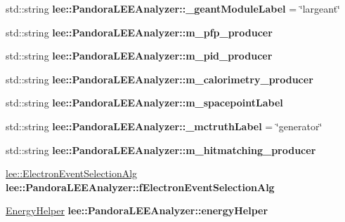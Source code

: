 \begin{DoxyCompactItemize}
\item 
\hypertarget{group__lee_gaf68d4bc3b81df418e7925567e36e5996}{std\-::string {\bfseries lee\-::\-Pandora\-L\-E\-E\-Analyzer\-::\-\_\-geant\-Module\-Label} = \char`\"{}largeant\char`\"{}}\label{group__lee_gaf68d4bc3b81df418e7925567e36e5996}

\item 
\hypertarget{group__lee_ga4d931b0979f37341d7097520d6cb103d}{std\-::string {\bfseries lee\-::\-Pandora\-L\-E\-E\-Analyzer\-::m\-\_\-pfp\-\_\-producer}}\label{group__lee_ga4d931b0979f37341d7097520d6cb103d}

\item 
\hypertarget{group__lee_gac5fa9ebd50776233ccfbf82f5886411f}{std\-::string {\bfseries lee\-::\-Pandora\-L\-E\-E\-Analyzer\-::m\-\_\-pid\-\_\-producer}}\label{group__lee_gac5fa9ebd50776233ccfbf82f5886411f}

\item 
\hypertarget{group__lee_ga11a0a8879de1549d48e9fdfab8fc9365}{std\-::string {\bfseries lee\-::\-Pandora\-L\-E\-E\-Analyzer\-::m\-\_\-calorimetry\-\_\-producer}}\label{group__lee_ga11a0a8879de1549d48e9fdfab8fc9365}

\item 
\hypertarget{group__lee_ga7a5ae683e3f2b04f71812b689cd08b76}{std\-::string {\bfseries lee\-::\-Pandora\-L\-E\-E\-Analyzer\-::m\-\_\-spacepoint\-Label}}\label{group__lee_ga7a5ae683e3f2b04f71812b689cd08b76}

\item 
\hypertarget{group__lee_ga462f214c8a7ede15d53754c120f54d45}{std\-::string {\bfseries lee\-::\-Pandora\-L\-E\-E\-Analyzer\-::\-\_\-mctruth\-Label} = \char`\"{}generator\char`\"{}}\label{group__lee_ga462f214c8a7ede15d53754c120f54d45}

\item 
\hypertarget{group__lee_gafeca3ce0e272568cc6a1dbec12e87736}{std\-::string {\bfseries lee\-::\-Pandora\-L\-E\-E\-Analyzer\-::m\-\_\-hitmatching\-\_\-producer}}\label{group__lee_gafeca3ce0e272568cc6a1dbec12e87736}

\item 
\hypertarget{group__lee_gabc3e2092fa2fa08dce6f6eb6778519ce}{\hyperlink{classlee_1_1ElectronEventSelectionAlg}{lee\-::\-Electron\-Event\-Selection\-Alg} {\bfseries lee\-::\-Pandora\-L\-E\-E\-Analyzer\-::f\-Electron\-Event\-Selection\-Alg}}\label{group__lee_gabc3e2092fa2fa08dce6f6eb6778519ce}

\item 
\hypertarget{group__lee_ga15efa0b525385a8f0ac4547690d44194}{\hyperlink{classEnergyHelper}{Energy\-Helper} {\bfseries lee\-::\-Pandora\-L\-E\-E\-Analyzer\-::energy\-Helper}}\label{group__lee_ga15efa0b525385a8f0ac4547690d44194}


\end{DoxyCompactItemize}

